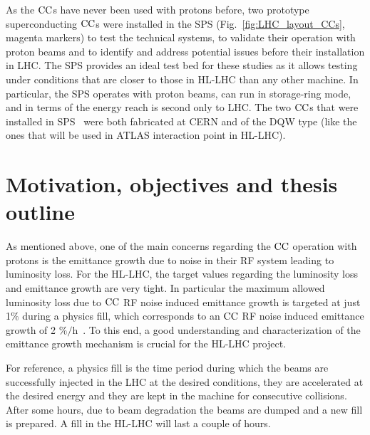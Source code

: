 

As the ${\mathrm{CC}}$s have never been used with protons before, two prototype superconducting ${\mathrm{CC}}$s were installed in the SPS (Fig.~\ref{fig:LHC_layout_CCs}, magenta markers) to test the technical systems, to validate their operation with proton beams and to identify and address potential issues before their installation in LHC. The SPS  provides an ideal test bed for these studies as it allows testing under conditions that are closer to those in HL-LHC than any other machine. In particular, the SPS operates with proton beams, can run in storage-ring mode, and in terms of the energy reach is second only to LHC. The two ${\mathrm{CC}}$s that were installed in SPS~\cite{Zanoni:2017} were both fabricated at CERN and of the DQW type (like the ones that will be used in ATLAS interaction point in HL-LHC).


\section{Motivation, objectives and thesis outline}\label{sec:motivation_outline}

As mentioned above, one of the main concerns regarding the ${\mathrm{CC}}$ operation with protons is the emittance growth due to noise in their RF system leading to luminosity loss. For the HL-LHC, the target values regarding the luminosity loss and emittance growth are very tight. In particular the maximum allowed luminosity loss due to ${\mathrm{CC}}$ RF noise induced emittance growth is targeted at just 1$\%$ during a physics fill, which corresponds to an ${\mathrm{CC}}$ RF noise induced emittance growth of 2 $\mathrm{\%/h}$~\cite{MedinaMedrano:2301928, CC_lumi_limits_philippe, CC_lumi_limits_ilias}. To this end, a good understanding and characterization of the emittance growth mechanism is crucial for the HL-LHC project.

For reference, a physics fill is the time period during which the beams are successfully injected in the LHC at the desired conditions, they are accelerated at the desired energy and they are kept in the machine for consecutive collisions. After some hours, due to beam degradation the beams are dumped and a new fill is prepared. A fill in the HL-LHC will last a couple of hours. 

